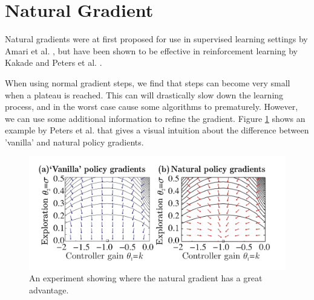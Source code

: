 \section{Natural Gradient}
\label{sec:natural}

Natural gradients were at first proposed for use in supervised learning settings by Amari et al. \cite{Amari:1998:NGW:287476.287477}, but have been shown to be effective in reinforcement learning by Kakade \cite{Kakade:2001} and Peters et al. \cite{4863}.

When using normal gradient steps, we find that steps can become very small when a plateau is reached. 
This can will drastically slow down the learning process, and in the worst case cause some algorithms to prematurely. 
However, we can use some additional information to refine the gradient. 
Figure \ref{fig:nat-grad-adv} shows an example by Peters et al. \cite{Peters_IICHR_2003} that gives a visual intuition about the difference between 'vanilla' and natural policy gradients. 

\begin{figure}
  \includegraphics[width=\textwidth]{nat-grad-adv}
  \caption{An experiment showing where the natural gradient has a great advantage. \cite{Peters_IICHR_2003} }\label{fig:nat-grad-adv}
\end{figure}

